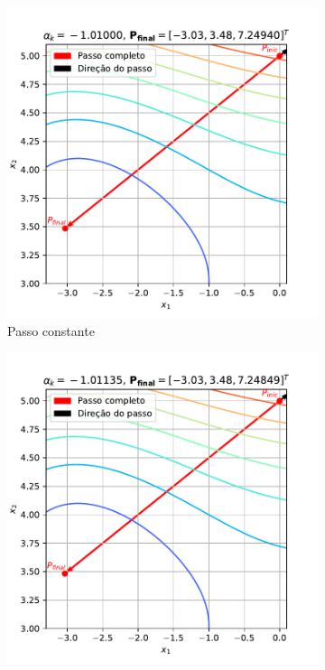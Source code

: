 \documentclass[10pt, a4paper]{article}
\begin{document}
\begin{figure}[htpb]
  \centering
  \begin{subfigure}[b]{0.32\textwidth}
      \centering
      \includegraphics[width=\textwidth]{images/q2c2_1.pdf}
      \caption{Passo constante}
      \label{fig:q2c2_1}
  \end{subfigure}
  \hfill
  \begin{subfigure}[b]{0.32\textwidth}
      \centering
      \includegraphics[width=\textwidth]{images/q2c2_2.pdf}

\end{subfigure}
\end{figure}
\end{document}
